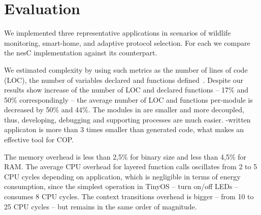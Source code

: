 \section{Evaluation}\label{sec:eval}

We implemented three representative applications in scenarios of wildlife
monitoring, smart-home, and adaptive protocol selection. For each we compare
the nesC implementation against its \conesc counterpart.

We estimated complexity by using such metrics as the number of lines of code
(LOC), the number of variables declared and functions defined~\cite{Pressman01}.
Despite our results show increase of the number of LOC and declared functions --
17\% and 50\% correspondingly -- the average number of LOC and functions
per-module is decreased by 50\% and 44\%. The modules in \conesc are smaller
and more decoupled, thus, developing, debugging and supporting processes are
much easier. \conesc-written applicaton is more than 3 times smaller than
generated code, what makes \conesc an effective tool for COP.

The memory overhead is less than 2,5\% for binary size and less than
4,5\% for RAM. The average CPU overhead for layered function calls oscillates
from 2 to 5 CPU cycles depending on application, which is negligible in terms of
energy consumption, since the simplest operation in TinyOS -- turn on/off LEDs
-- consumes 8 CPU cycles. The context transitions overhead is bigger -- from 10
to 25 CPU cycles -- but remains in the same order of magnitude.
